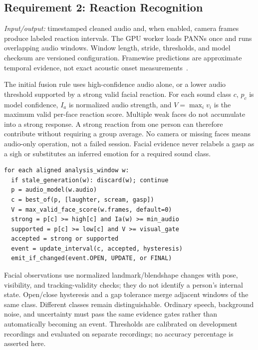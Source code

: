 \subsection{Requirement 2: Reaction Recognition}
\textit{Input/output:} timestamped cleaned audio and, when enabled, camera frames produce labeled reaction intervals. The GPU worker loads PANNs once and runs overlapping audio windows. Window length, stride, thresholds, and model checksum are versioned configuration. Framewise predictions are approximate temporal evidence, not exact acoustic onset measurements~\cite{panns}.

The initial fusion rule uses high-confidence audio alone, or a lower audio threshold supported by a strong valid facial reaction. For each sound class $c$, $p_c$ is model confidence, $I_a$ is normalized audio strength, and $V=\max_i v_i$ is the maximum valid per-face reaction score. Multiple weak faces do not accumulate into a strong response. A strong reaction from one person can therefore contribute without requiring a group average. No camera or missing faces means audio-only operation, not a failed session. Facial evidence never relabels a gasp as a sigh or substitutes an inferred emotion for a required sound class.
\par\smallskip\noindent\begin{minipage}{\columnwidth}
\begin{lstlisting}
for each aligned analysis_window w:
  if stale_generation(w): discard(w); continue
  p = audio_model(w.audio)
  c = best_of(p, [laughter, scream, gasp])
  V = max_valid_face_score(w.frames, default=0)
  strong = p[c] >= high[c] and Ia(w) >= min_audio
  supported = p[c] >= low[c] and V >= visual_gate
  accepted = strong or supported
  event = update_interval(c, accepted, hysteresis)
  emit_if_changed(event.OPEN, UPDATE, or FINAL)
\end{lstlisting}
\end{minipage}\par
Facial observations use normalized landmark/blendshape changes with pose, visibility, and tracking-validity checks; they do not identify a person's internal state. Open/close hysteresis and a gap tolerance merge adjacent windows of the same class. Different classes remain distinguishable. Ordinary speech, background noise, and uncertainty must pass the same evidence gates rather than automatically becoming an event. Thresholds are calibrated on development recordings and evaluated on separate recordings; no accuracy percentage is asserted here.


